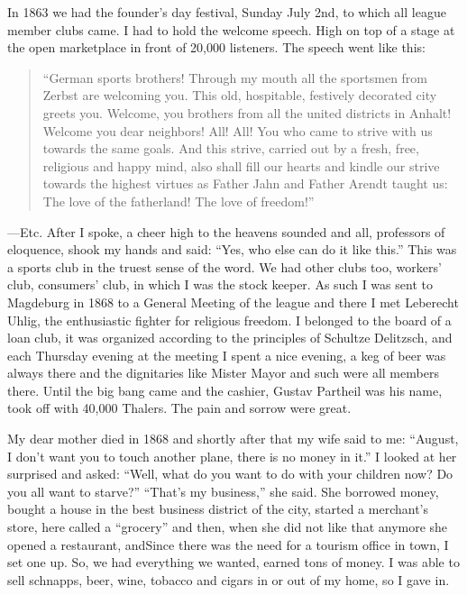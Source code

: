 \documentclass{article}
\begin{document}
In 1863 we had the founder's day festival, Sunday July 2nd, to which all league member clubs came. I had to hold the welcome speech. High on top of a stage at the open marketplace in front of 20,000 listeners. The speech went like this:

\begin{quote}
``German sports brothers! Through my mouth all the sportsmen from Zerbst are welcoming you. This old, hospitable, festively decorated city greets you. Welcome, you brothers from all the united districts in Anhalt! Welcome you dear neighbors! All! All! You who came to strive with us towards the same goals. And this strive, carried out by a fresh, free, religious and happy mind, also shall fill our hearts and kindle our strive towards the highest virtues as Father Jahn and Father Arendt taught us: The love of the fatherland! The love of freedom!''
\end{quote}

---Etc. After I spoke, a cheer high to the heavens sounded and all, professors of eloquence, shook my hands and said: ``Yes, who else can do it like this.'' This was a sports club in the truest sense of the word. We had other clubs too, workers' club, consumers' club, in which I was the stock keeper. As such I was sent to Magdeburg in 1868 to a General Meeting of the league and there I met Leberecht Uhlig, the enthusiastic fighter for religious freedom. I belonged to the board of a loan club, it was organized according to the principles of Schultze Delitzsch, and each Thursday evening at the meeting I spent a nice evening, a keg of beer was always there and the dignitaries like Mister Mayor and such were all members there. Until the big bang came and the cashier, Gustav Partheil was his name, took off with 40,000 Thalers. The pain and sorrow were great.

My dear mother died in 1868 and shortly after that my wife said to me: ``August, I don't want you to touch another plane, there is no money in it.'' I looked at her surprised and asked: ``Well, what do you want to do with your children now? Do you all want to starve?'' ``That's my business,'' she said. She borrowed money, bought a house in the best business district of the city, started a merchant's store, here called a ``grocery'' and then, when she did not like that anymore she opened a restaurant, andSince there was the need for a tourism office in town, I set one up. So, we had everything we wanted, earned tons of money. I was able to sell schnapps, beer, wine, tobacco and cigars in or out of my home, so I gave in.
\end{document}
